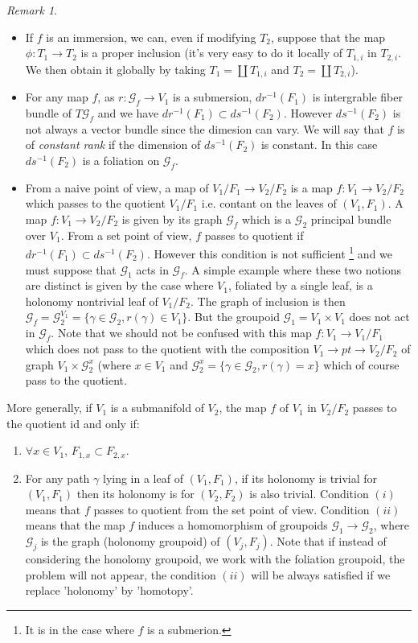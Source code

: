 \documentclass[12pt]{amsart}
\theoremstyle{definition}
\theoremstyle{remark}
\newtheorem{rem}[thm]{Remark}
\numberwithin{equation}{section}
\newcommand{\CG}{{\mathcal G}}
\begin{document}
\begin{rem}


 \begin{itemize}
     \item If $f$ is an immersion, we can, even if modifying $T_2$, suppose that the map $\phi: T_1 \to T_2$ is a proper inclusion (it's very easy to do it locally of $T_{1,i}$ in $T_{2,i}$. We then obtain it globally by taking $T_1 = \coprod T_{1,i}$ and $T_2 = \coprod T_{2,i}$).
     
     \item For any map $f$, as $r: \CG_f \to V_1$ is a submersion, $dr^{-1}(F_1)$ is intergrable fiber bundle of $T\CG_f$ and we have $dr^{-1}(F_1) \subset ds^{-1}(F_2)$. However $ds^{-1}(F_2)$ is not always a vector bundle since the dimesion can vary. We will say that $f$ is of {\it constant rank} if the dimension of $ds^{-1}(F_2)$ is constant. In this case $ds^{-1}(F_2)$ is a foliation on $\CG_f$.
     
     \item From a naive point of view, a map of $V_1/F_1 \to V_2/F_2$ is a map $f: V_1 \to V_2/F_2$ which passes to the quotient $V_1/F_1$ i.e. contant on the leaves of $(V_1, F_1)$. A map $f: V_1 \to V_2/ F_2$ is given by its graph $\CG_f$ which is a $\CG_2$ principal bundle over $V_1$. From a set point of view, $f$ passes to quotient if $dr^{-1}(F_1) \subset ds^{-1}(F_2)$. However this condition is not sufficient \footnote{It is in the case where $f$ is a submerion.} and we must suppose that $\CG_1$ acts in $\CG_f$. A simple example where these two notions are distinct is given by the case where $V_1$,  foliated by a single leaf, is a holonomy nontrivial leaf of $V_1/F_2$. The graph of inclusion is then $\CG_f = \CG_2^{V_1}= \{\gamma \in \CG_2, r(\gamma) \in V_1\} $. But the groupoid $\CG_1 = V_1 \times 
     V_1$ does not act in $\CG_f$. Note that we should not be confused with this map $f: V_1 \to V_1/F_1$ which does not pass to the quotient with the composition $V_1 \to pt \to V_2/F_2$ of graph $V_1 \times \CG_2^x$ (where $x\in V_1$ and $\CG_2^x = \{\gamma \in \CG_2, r(\gamma) = x\}$ which of course pass to the quotient. \end{itemize} 
     
     More generally, if $V_1$ is a submanifold of $V_2$, the map $f$ of $V_1$ in $V_2/F_2$ passes to the quotient id and only if:
     \begin{enumerate}
         \item $\forall x \in V_1$, $F_{1,x} \subset F_{2,x}$.
         \item For any path $\gamma$ lying in a leaf of $(V_1, F_1)$, if its holonomy is trivial for $(V_1, F_1)$ then its holonomy is for $(V_2, F_2)$ is also trivial. Condition $(i)$ means that $f$ passes to quotient from the set point of view. Condition $(ii)$ means that the map $f$ induces a homomorphism of groupoids $\CG_1 \to \CG_2$, where $\CG_j$ is the graph (holonomy groupoid) of $(V_j, F_j)$. 
         Note that if instead of considering the honolomy groupoid, we work with the foliation groupoid, the problem will not appear, the condition $(ii)$ will be always satisfied if we replace 'holonomy' by 'homotopy'.
         


\end{enumerate}
\end{rem}
\end{document}
